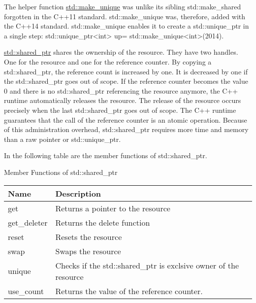 

The helper function \href{http://en.cppreference.com/w/cpp/memory/unique_ptr/make_unique}{std::make\_unique} was unlike its sibling std::make\_shared forgotten in the C++11 standard. std::make\_unique was, therefore, added with the C++14 standard. std::make\_unique enables it to create a std::unique\_ptr in a single step: std::unique\_ptr<int> up= std::make\_unique<int>(2014).



\href{http://en.cppreference.com/w/cpp/memory/shared_ptr}{std::shared\_ptr} shares the ownership of the resource. They have two handles. One for the resource and one for the reference counter. By copying a std::shared\_ptr, the reference count is increased by one. It is decreased by one if the std::shared\_ptr goes out of scope. If the reference counter becomes the value 0 and there is no std::shared\_ptr referencing the resource anymore, the C++ runtime automatically releases the resource. The release of the resource occurs precisely when the last std::shared\_ptr goes out of scope. The C++ runtime guarantees that the call of the reference counter is an atomic operation. Because of this administration overhead, std::shared\_ptr requires more time and memory than a raw pointer or std::unique\_ptr.

In the following table are the member functions of std::shared\_ptr.

\begin{center}
Member Functions of std::shared\_ptr
\end{center}

\begin{longtable}[c]{|l|l|}
\hline
\textbf{Name} & \textbf{Description}                                             \\ \hline
\endfirsthead
%
\endhead
%
get           & Returns a pointer to the resource                                \\ \hline
get\_deleter  & Returns the delete function                                      \\ \hline
reset         & Resets the resource                                              \\ \hline
swap          & Swaps the resource                                               \\ \hline
unique        & Checks if the std::shared\_ptr is exclsive owner of the resource \\ \hline
use\_count    & Returns the value of the reference counter.                      \\ \hline
\end{longtable}

